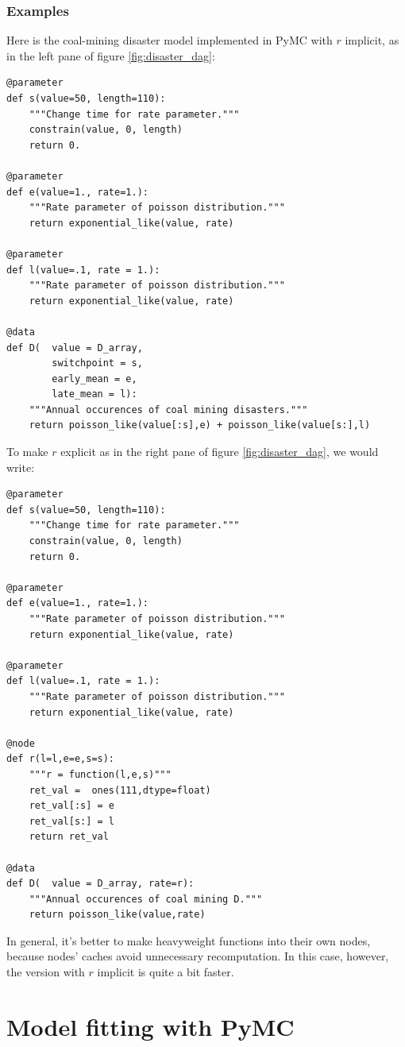 \documentclass[]{book}
\begin{document}
\subsection{Examples}\label{sub:example}
Here is the coal-mining disaster model implemented in PyMC with $r$ implicit, as in the left pane of figure \ref{fig:disaster_dag}:
\begin{verbatim}
@parameter
def s(value=50, length=110):
    """Change time for rate parameter."""
    constrain(value, 0, length)
    return 0.

@parameter
def e(value=1., rate=1.):
    """Rate parameter of poisson distribution."""
    return exponential_like(value, rate)

@parameter
def l(value=.1, rate = 1.):
    """Rate parameter of poisson distribution."""
    return exponential_like(value, rate)

@data
def D(  value = D_array,
        switchpoint = s,
        early_mean = e,
        late_mean = l):
    """Annual occurences of coal mining disasters."""
    return poisson_like(value[:s],e) + poisson_like(value[s:],l)
\end{verbatim}
To make $r$ explicit as in the right pane of figure \ref{fig:disaster_dag}, we would write:
\begin{verbatim}
@parameter
def s(value=50, length=110):
    """Change time for rate parameter."""
    constrain(value, 0, length)
    return 0.

@parameter
def e(value=1., rate=1.):
    """Rate parameter of poisson distribution."""
    return exponential_like(value, rate)

@parameter
def l(value=.1, rate = 1.):
    """Rate parameter of poisson distribution."""
    return exponential_like(value, rate)

@node
def r(l=l,e=e,s=s):
    """r = function(l,e,s)"""
    ret_val =  ones(111,dtype=float)
    ret_val[:s] = e
    ret_val[s:] = l
    return ret_val

@data
def D(  value = D_array, rate=r):
    """Annual occurences of coal mining D."""
    return poisson_like(value,rate)
\end{verbatim}
In general, it's better to make heavyweight functions into their own nodes, because nodes' caches avoid unnecessary recomputation. In this case, however, the version with $r$ implicit is quite a bit faster.

\chapter{Model fitting with PyMC} %
\label{chap:MCMC}
\end{document}
